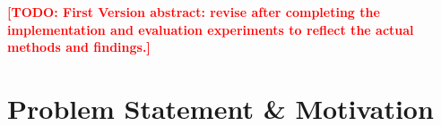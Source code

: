 \documentclass[11pt]{article}
\newcommand{\todo}[1]{\textcolor{red}{\textbf{[TODO: #1]}}}
\begin{document}
\author{
    Marwan Hatem Hosny Mobarak
    \and
    Kirolos Thabet Fouad Benjamin
    \and
    Abdulrahman Mohamed Abdullah Ragab
}

\date{
    Milestone 1 --- 2 November 2026 \\[2pt]
    CSE 681 --- Digital Image Processing
}

\maketitle


\begin{abstract}

3--5 sentences: what problem are you tackling, why does it matter,
what is your planned approach, and what public dataset/baseline
will you use. Write this last.

\end{abstract}

\noindent
\todo{First Version abstract: revise after completing the
implementation and evaluation experiments to reflect the actual
methods and findings.}


\section{Problem Statement \& Motivation}
\label{sec:motivation}
\end{document}
